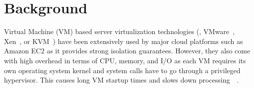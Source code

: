 \section{Background}
\label{sec:background}



Virtual Machine (VM) based server virtualization technologies (\eg, VMware~\cite{VMware},
Xen~\cite{xen}, or KVM~\cite{KVM}) have been extensively used by major cloud
platforms such as Amazon EC2 as it provides strong isolation guarantees.
%
%
However, they also come with high overhead in terms of CPU, memory, and I/O as
each VM requires its own operating system kernel and system calls have to go
through a privileged hypervisor. This causes long VM startup times and slows down
processing~\cite{Disco}~\cite{HypervisorsvsLightweight}.
%
%

